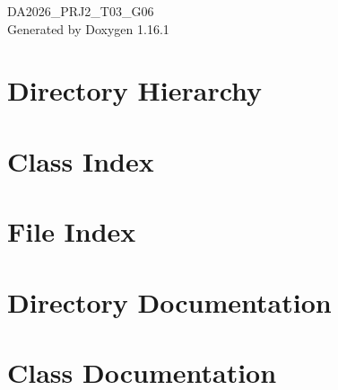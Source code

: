\documentclass[twoside]{book}
\newcommand{\+}{\discretionary{\mbox{\scriptsize$\hookleftarrow$}}{}{}}
\newcommand{\clearemptydoublepage}{%
    \newpage{\pagestyle{empty}\cleardoublepage}%
  }
\begin{document}
  \raggedbottom
    \hypersetup{pageanchor=false,
                bookmarksnumbered=true,
                pdfencoding=unicode
               }
  \begin{titlepage}
  \vspace*{7cm}
  \begin{center}%
  {\Large DA2026\+\_\+\+PRJ2\+\_\+\+T03\+\_\+\+G06}\\
  \vspace*{1cm}
  {\large Generated by Doxygen 1.16.1}\\
  \end{center}
  \end{titlepage}
  \clearemptydoublepage
  \tableofcontents
  \clearemptydoublepage
  \hypersetup{pageanchor=true}

\chapter{Directory Hierarchy}

\chapter{Class Index}

\chapter{File Index}

\chapter{Directory Documentation}






\chapter{Class Documentation}










\end{document}
